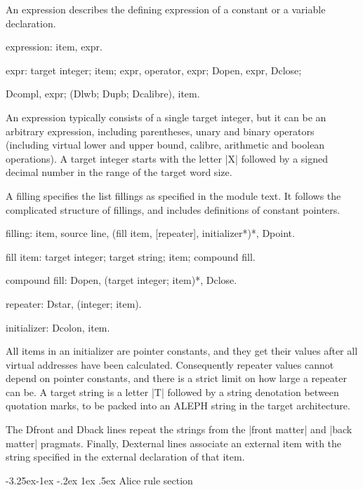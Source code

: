 \documentclass[titlepage]{article}
\makeatletter
\newcommand\A{\textsf{ALEPH}}
\newenvironment{grammar}{%
\begin{list}{}{%
\setlength\leftmargin{18pt}%
\setlength\rightmargin{-5pt}%
\setlength\listparindent{20pt}%
\setlength\itemsep{1pt plus0.2ex}%
\setlength\parsep{0pt plus 2pt}%
\setlength\labelsep{-5pt}%
}\color{blue!90!black}\sf\mkoptions%
}{\end{list}}
\newcommand\g[1]{\textsf{\color{blue!90!black}#1}}
\renewcommand\subsection{%
\@startsection{subsection}{2}{\z@}%
   {-3.25ex\@plus -1ex \@minus -.2ex}%
   {1ex \@plus .5ex}%
   {\normalfont\normalsize\bfseries}}
\makeatother
\begin{document}
\smallskip

An \g{expression} describes the defining expression of a \g{constant} or a
\g{variable} declaration.
\begin{grammar}
\item expression: item, expr.
\item expr: target integer; item; expr, operator, expr; Dopen, expr, Dclose;

   Dcompl, expr; (Dlwb; Dupb; Dcalibre), item.
\end{grammar}
An \g{expression} typically consists of a single target integer, but it can be
an arbitrary expression, including parentheses, unary and binary operators
(including virtual lower and upper bound, calibre, arithmetic and boolean
operations). A \g{target integer} starts with the letter \pp|X| followed by
a signed decimal number in the range of the target word size.

\smallskip

A \g{filling} specifies the list fillings as specified in the module text. It 
follows the complicated structure of fillings, and includes definitions of
constant pointers.
\begin{grammar}
\item filling: item, source line, (fill item, [repeater], 
initializer*)*, Dpoint.
\item fill item: target integer; target string; item; compound fill.
\item compound fill: Dopen, (target integer; item)*, Dclose.
\item repeater: Dstar, (integer; item).
\item initializer: Dcolon, item. 
\end{grammar}
All \g{item}s in an \g{initializer} are pointer constants, and they get
their values after all virtual addresses have been calculated. Consequently repeater
values cannot depend on pointer constants, and there is a strict limit on
how large a repeater can be. A \g{target string} is a letter \pp|T| followed
by a string denotation between quotation marks, to be packed into an \A{} string
in the target architecture.

\smallskip

The \g{Dfront} and \g{Dback} lines repeat the strings from the
\pp|front matter| and \pp|back matter| pragmats. Finally, \g{Dexternal} lines
associate an external item with the string specified in the external declaration 
of that item.

\subsection{Alice rule section}
\end{document}
